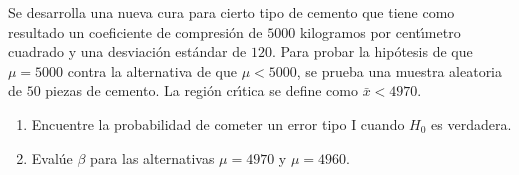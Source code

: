 \begin{enunciado}
 Se desarrolla una nueva cura para cierto tipo de cemento que tiene como resultado un coeficiente de compresi\'on de $5000$ kilogramos por cent\'{\i}metro cuadrado y una desviaci\'on est\'andar de $120$. Para probar la hip\'otesis de que $\mu = 5000$ contra la alternativa de que $\mu < 5000$, se prueba una muestra aleatoria de $50$ piezas de cemento. La regi\'on cr\'{\i}tica se define como $\bar{x} < 4970$.
 \begin{enumerate}
  \item Encuentre la probabilidad de cometer un error tipo I cuando $H_0$ es verdadera.
  
  \item Eval\'ue $\beta$ para las alternativas $\mu = 4970$ y $\mu = 4960$.
 \end{enumerate}
\end{enunciado}


